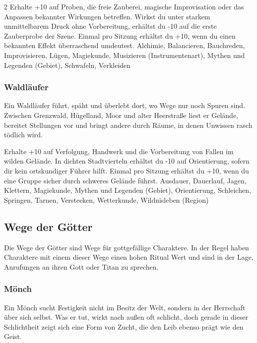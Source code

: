 {\begin{multicols*}{2}
        \wegespielwertebox
        {Erhalte +10 auf Proben, die freie Zauberei, magische Improvisation oder das Anpassen bekannter Wirkungen betreffen.}
        {Wirkst du unter starkem unmittelbarem Druck ohne Vorbereitung, erhältst du -10 auf die erste Zauberprobe der Szene.}
        {Einmal pro Sitzung erhältst du +10, wenn du einen bekannten Effekt überraschend umdeutest.}
        {Alchimie, Balancieren, Bauchreden, Improvisieren, Lügen, Magiekunde, Musizieren (Instrumentenart), Mythen und Legenden (Gebiet), Schwafeln, Verkleiden}

        \subsubsection*{Waldläufer}
        Ein Waldläufer führt, späht und überlebt dort, wo Wege nur noch Spuren sind. Zwischen Grenzwald, Hügelland, Moor und alter Heerstraße liest er Gelände, bereitet Stellungen vor und bringt andere durch Räume, in denen Unwissen rasch tödlich wird.

        \wegespielwertebox
        {Erhalte +10 auf Verfolgung, Handwerk und die Vorbereitung von Fallen im wilden Gelände.}
        {In dichten Stadtvierteln erhältst du -10 auf Orientierung, sofern dir kein ortskundiger Führer hilft.}
        {Einmal pro Sitzung erhältst du +10, wenn du eine Gruppe sicher durch schweres Gelände führst.}
        {Ausdauer, Dauerlauf, Jagen, Klettern, Magiekunde, Mythen und Legenden (Gebiet), Orientierung, Schleichen, Springen, Tarnen, Verstecken, Wetterkunde, Wildnisleben (Region)}

        \subsection{Wege der Götter}\label{subsec:wege-goetter}

        Die Wege der Götter sind Wege für gottgefällige Charaktere. In der Regel haben Charaktere mit einem dieser Wege einen hohen Ritual Wert und sind in der Lage, Anrufungen an ihren Gott oder Titan zu sprechen.

        \subsubsection*{Mönch}
        Ein Mönch sucht Festigkeit nicht im Besitz der Welt, sondern in der Herrschaft über sich selbst. Was er tut, wirkt nach außen oft schlicht, doch gerade in dieser Schlichtheit zeigt sich eine Form von Zucht, die den Leib ebenso prägt wie den Geist.


\end{multicols*}}
